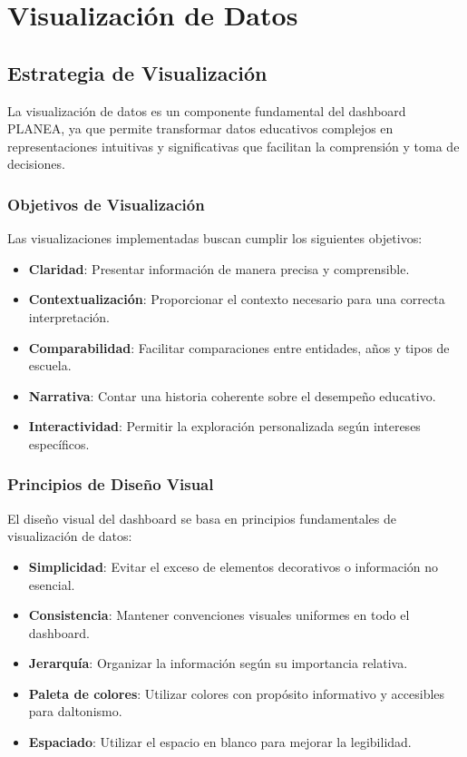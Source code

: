\chapter{Visualización de Datos}

\section{Estrategia de Visualización}
La visualización de datos es un componente fundamental del dashboard PLANEA, ya que permite transformar datos educativos complejos en representaciones intuitivas y significativas que facilitan la comprensión y toma de decisiones.

\subsection{Objetivos de Visualización}
Las visualizaciones implementadas buscan cumplir los siguientes objetivos:

\begin{itemize}
    \item \textbf{Claridad}: Presentar información de manera precisa y comprensible.
    \item \textbf{Contextualización}: Proporcionar el contexto necesario para una correcta interpretación.
    \item \textbf{Comparabilidad}: Facilitar comparaciones entre entidades, años y tipos de escuela.
    \item \textbf{Narrativa}: Contar una historia coherente sobre el desempeño educativo.
    \item \textbf{Interactividad}: Permitir la exploración personalizada según intereses específicos.
\end{itemize}

\subsection{Principios de Diseño Visual}
El diseño visual del dashboard se basa en principios fundamentales de visualización de datos:

\begin{itemize}
    \item \textbf{Simplicidad}: Evitar el exceso de elementos decorativos o información no esencial.
    \item \textbf{Consistencia}: Mantener convenciones visuales uniformes en todo el dashboard.
    \item \textbf{Jerarquía}: Organizar la información según su importancia relativa.
    \item \textbf{Paleta de colores}: Utilizar colores con propósito informativo y accesibles para daltonismo.
    \item \textbf{Espaciado}: Utilizar el espacio en blanco para mejorar la legibilidad.
\end{itemize}

